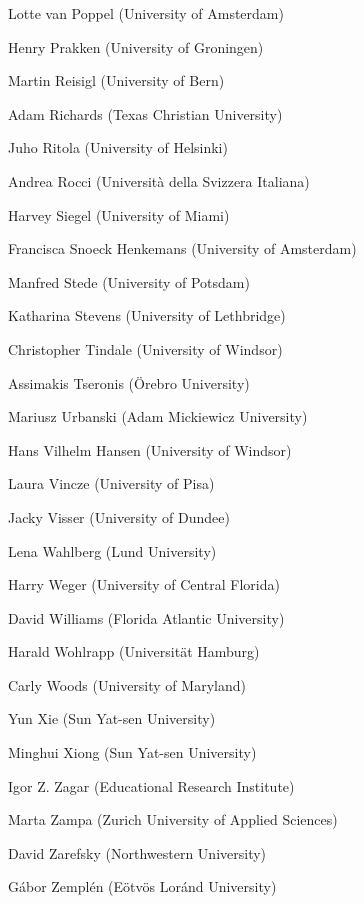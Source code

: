 \begin{compactitem}[]
		\item[] Lotte van Poppel (University of Amsterdam)
		\item[] Henry Prakken (University of Groningen)
		\item[] Martin Reisigl (University of Bern)
		\item[] Adam Richards (Texas Christian University)
		\item[] Juho Ritola (University of Helsinki)
		\item[] Andrea Rocci (Università della Svizzera Italiana)
		\item[] Harvey Siegel (University of Miami)
		\item[] Francisca Snoeck Henkemans (University of Amsterdam)
		\item[] Manfred Stede (University of Potsdam)
		\item[] Katharina Stevens (University of Lethbridge)
		\item[] Christopher Tindale (University of Windsor)
		\item[] Assimakis Tseronis (Örebro University)
		\item[] Mariusz Urbanski (Adam Mickiewicz University)
		\item[] Hans Vilhelm Hansen (University of Windsor)
		\item[] Laura Vincze (University of Pisa)
		\item[] Jacky Visser (University of Dundee)
		\item[] Lena Wahlberg (Lund University)
		\item[] Harry Weger (University of Central Florida)
		\item[] David Williams (Florida Atlantic University)
		\item[] Harald Wohlrapp (Universität Hamburg)
		\item[] Carly Woods (University of Maryland)
		\item[] Yun Xie (Sun Yat-sen University)
		\item[] Minghui Xiong (Sun Yat-sen University)
		\item[] Igor Z. Zagar (Educational Research Institute)
		\item[] Marta Zampa (Zurich University of Applied Sciences)
		\item[] David Zarefsky (Northwestern University)
		\item[] Gábor Zemplén (Eötvös Loránd University)
	\end{compactitem}
